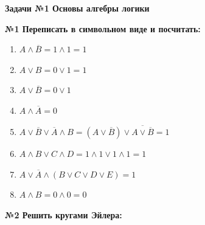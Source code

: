 



    \begin{center}
        \textbf{Задачи №1 Основы алгебры логики}
    \end{center}

    \begin{center}
        \textbf{№1 Переписать в символьном виде и посчитать:}
    \end{center}

    \begin{enumerate}
        \item $A \wedge \overline B = 1 \wedge 1 = 1$
        \item $A \vee B = 0 \vee 1 = 1$
        \item $A \vee \overline B = 0 \vee 1$
        \item $A \wedge \overline A = 0$
        \item $A \vee \overline B \vee \overline A \wedge B = (A \vee \overline B) \vee \overline{A \vee \overline B} = 1$
        \item $A \wedge B \vee C \wedge D = 1 \wedge 1 \vee 1 \wedge 1 = 1$
        \item $A \vee \overline A \wedge (B \vee C \vee D \vee E) = 1$
        \item $A \wedge B = 0 \wedge 0 = 0$

    \end{enumerate}



    \begin{center}
        \textbf{№2 Решить кругами Эйлера:}
    \end{center}

